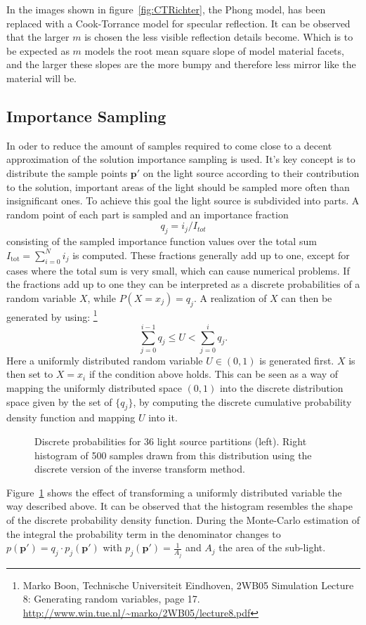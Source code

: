 In the images shown in figure~\ref*{fig:CTRichter}, the Phong model, has been replaced with a Cook-Torrance model for specular reflection. It can be observed that the larger $m$ is chosen the less visible reflection details become. Which is to be expected as $m$ models the root mean square slope of model material facets, and the larger these slopes are the more bumpy and therefore less mirror like the material will be.

\subsection{Importance Sampling}
In oder to  reduce the amount of samples required to come close to a decent approximation of the solution importance sampling is used. It's key concept is to distribute the sample points $\mathbf{p}'$ on the light source according to their contribution to the solution, important areas of the light should be sampled more often than insignificant ones. To achieve this goal the light source is subdivided into parts. A random point of each part is sampled and an importance fraction
\begin{equation}
q_j = i_j/I_{tot}
\end{equation}
consisting of the sampled importance function values over the total sum $I_{\text{tot}} = \sum_{i=0}^{N} i_j$ is computed. These fractions generally add up to one, except for cases where the total sum is very small, which can cause numerical problems. If the fractions add up to one they can be interpreted as a discrete probabilities of a random variable $X$, while $P(X = x_j) = q_j$. A realization of $X$ can then be generated by using:  \footnote{Marko Boon, Technische Universiteit Eindhoven, 2WB05 Simulation Lecture 8: Generating random variables, page 17. \url{http://www.win.tue.nl/~marko/2WB05/lecture8.pdf}}
\begin{equation}
\sum\limits_{j=0}^{i-1} q_j \leq U < \sum\limits_{j=0}^{i} q_j.
\end{equation} 
Here a uniformly distributed random variable $U \in (0,1)$ is generated first. $X$ is then set to $X = x_i$ if the condition above holds. This can be seen as a way of mapping the uniformly distributed space $(0,1)$ into the discrete distribution space given by the set of $\{q_j\}$, by computing the discrete cumulative probability density function and mapping $U$ into it.  
\begin{figure}
\centering


\caption{Discrete probabilities for 36 light source partitions (left). Right histogram of 500 samples drawn from this distribution using the discrete version of the inverse transform method.  }
\label{fig:invTrans}
\end{figure}
Figure~\ref{fig:invTrans} shows the effect of transforming a uniformly distributed variable the way described above. It can be observed that the histogram resembles the shape of the discrete probability density function. During the Monte-Carlo estimation of the integral the probability term in the denominator changes to $p(\mathbf{p}') = q_j \cdot p_j(\mathbf{p}')$ with $p_j(\mathbf{p}') = \frac{1}{A_j}$ and $A_j$ the area of the sub-light.

